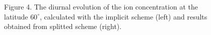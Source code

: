 \documentclass[9pt, apectratio=43,unicode]{beamer}
\begin{document}
\begin{frame}
\begin{figure}[H]
\begin{minipage}[c]{0.490\linewidth}
\flushleft
{} %
\end{minipage}
\hfill
\begin{minipage}[c]{0.490\linewidth}
\flushleft
{} %
\end{minipage}

Figure 4. The diurnal evolution of the ion concentration at the latitude $60^\circ$, calculated with the implicit scheme (left) and results obtained from splitted scheme (right).
\end{figure}



\end{frame}
\end{document}
